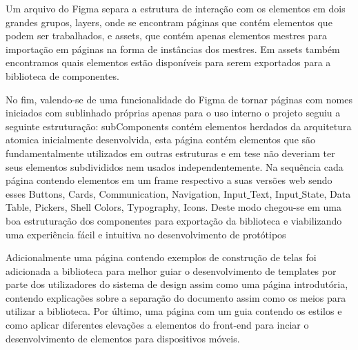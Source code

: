 Um arquivo do Figma separa a estrutura de interação com os elementos em dois grandes grupos, layers, onde se encontram páginas que contém elementos que podem ser trabalhados, e assets, que contém apenas elementos mestres para importação em páginas na forma de instâncias dos mestres. Em assets também encontramos quais elementos estão disponíveis para serem exportados para a biblioteca de componentes.

No fim, valendo-se de uma funcionalidade do Figma de tornar páginas com nomes iniciados com sublinhado próprias apenas para o uso interno o projeto seguiu a seguinte estruturação: \underline{ }subComponents contém elementos herdados da arquitetura atomica inicialmente desenvolvida, esta página contém elementos que são fundamentalmente utilizados em outras estruturas e em tese não deveriam ter seus elementos subdivididos nem usados independentemente. Na sequência cada página contendo elementos em um frame respectivo a suas versões web sendo esses Buttons, Cards, Communication, Navigation, Input\underline{ }Text, Input\underline{ }State, Data\underline{ }Table, Pickers, Shell Colors, Typography, Icons. Deste modo chegou-se em uma boa estruturação dos componentes para exportação da biblioteca e viabilizando uma experiência fácil e intuitiva no desenvolvimento de protótipos

Adicionalmente uma página contendo exemplos de construção de telas foi adicionada a biblioteca para melhor guiar o desenvolvimento de templates por parte dos utilizadores do sistema de design assim como uma página introdutória, contendo explicações sobre a separação do documento assim como os meios para utilizar a biblioteca. Por último, uma página com um guia contendo os estilos e como aplicar diferentes elevações a elementos do front-end para inciar o desenvolvimento de elementos para dispositivos móveis.
